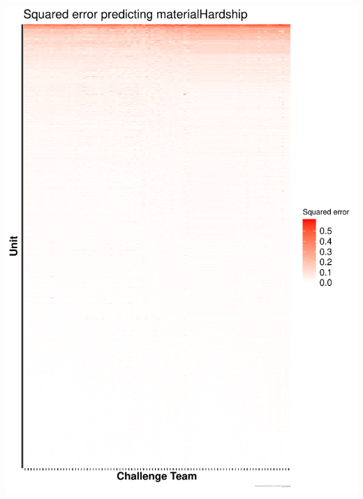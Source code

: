 \documentclass{beamer}
\begin{document}
\begin{frame}

\begin{center}
\includegraphics[width=0.30\textheight]{figures/materialHardship_ysort_mse_unit_outcome_xsort_mse_account_outcome.pdf}

\end{center}
\end{frame}
\end{document}
